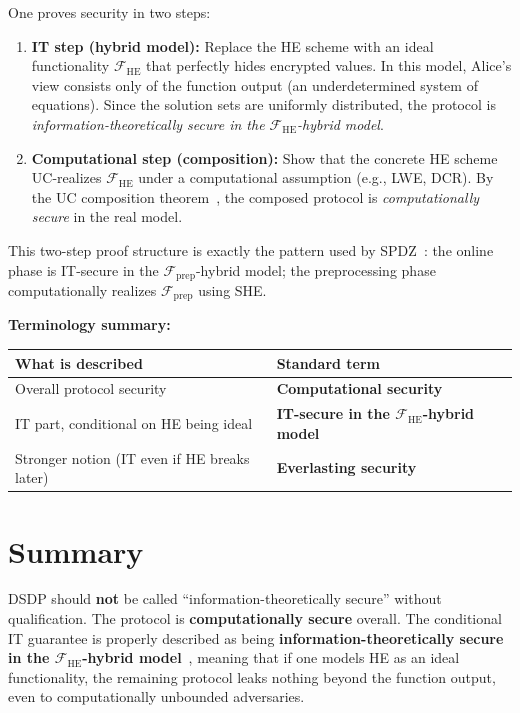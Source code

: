 \documentclass{article}
\begin{document}
One proves security in two steps:

\begin{enumerate}
  \item \textbf{IT step (hybrid model):} Replace the HE scheme with an ideal functionality $\mathcal{F}_{\mathrm{HE}}$ that perfectly hides encrypted values. In this model, Alice's view consists only of the function output (an underdetermined system of equations). Since the solution sets are uniformly distributed, the protocol is \emph{information-theoretically secure in the $\mathcal{F}_{\mathrm{HE}}$-hybrid model}.
  \item \textbf{Computational step (composition):} Show that the concrete HE scheme UC-realizes $\mathcal{F}_{\mathrm{HE}}$ under a computational assumption (e.g., LWE, DCR). By the UC composition theorem~\cite{Canetti2001}, the composed protocol is \emph{computationally secure} in the real model.
\end{enumerate}

This two-step proof structure is exactly the pattern used by SPDZ~\cite{SPDZ2012springer}: the online phase is IT-secure in the $\mathcal{F}_{\mathrm{prep}}$-hybrid model; the preprocessing phase computationally realizes $\mathcal{F}_{\mathrm{prep}}$ using SHE.

\medskip

\noindent\textbf{Terminology summary:}

\begin{center}
\begin{tabular}{l l}
  \hline
  What is described & Standard term \\
  \hline
  Overall protocol security & \textbf{Computational security} \\
  IT part, conditional on HE being ideal & \textbf{IT-secure in the $\mathcal{F}_{\mathrm{HE}}$-hybrid model} \\
  Stronger notion (IT even if HE breaks later) & \textbf{Everlasting security}~\cite{MullerQuadeUnruh2007} \\
  \hline
\end{tabular}
\end{center}

\section{Summary}

DSDP should \textbf{not} be called ``information-theoretically secure'' without qualification. The protocol is \textbf{computationally secure} overall. The conditional IT guarantee is properly described as being \textbf{information-theoretically secure in the $\mathcal{F}_{\mathrm{HE}}$-hybrid model}~\cite{Canetti2001}, meaning that if one models HE as an ideal functionality, the remaining protocol leaks nothing beyond the function output, even to computationally unbounded adversaries.
\end{document}
